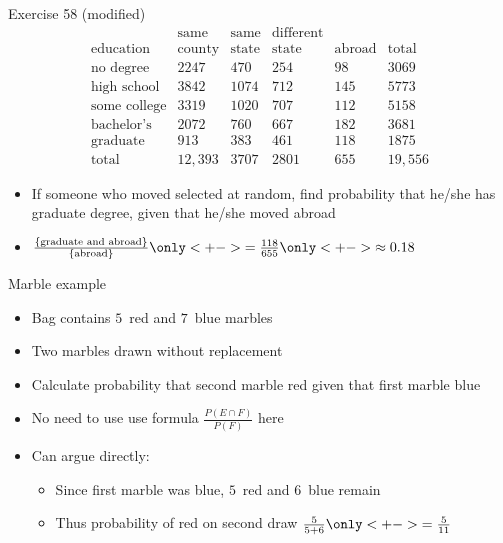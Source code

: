 \documentclass{beamer}
\theoremstyle{definition}
\begin{document}
\begin{frame}{Exercise 58 (modified)}
\[\begin{array}{r|llll|l}
&\text{same}&\text{same}&\text{different}&&\\
\text{education}&\text{county}
&\text{state}&\text{state}&\text{abroad}&\text{total}\\\hline
\text{no degree}&2247&470&254&98&3069\\
\text{high school}&3842&1074&712&145&5773\\
\text{some college}&3319&1020&707&112&5158\\
\text{bachelor's}&2072&760&667&182&3681\\
\text{graduate}&913&383&461&118&1875\\\hline
\text{total}&12,393&3707&2801&655&19,556
\end{array}\]
\begin{itemize}
\item If someone who moved selected at random, find probability
that he/she has graduate degree, given that he/she moved abroad
\item $\frac{\left\{\text{graduate and abroad}\right\}}
{\left\{\text{abroad}\right\}}
\only<+->{=\frac{118}{655}}\only<+->{\approx 0.18}$
\end{itemize}
\end{frame}

\begin{frame}{Marble example}
\begin{itemize}
\item Bag contains $5$~red and $7$~blue marbles
\item Two marbles drawn without replacement
\item Calculate probability that second marble red
given that first marble blue
\item No need to use use formula
$\frac{P\left(E\cap F\right)}{P\left(F\right)}$ here
\item Can argue directly:
\begin{itemize}
\item Since first marble was blue, $5$~red and \alert{$6$~blue} remain
\item Thus probability of red on second draw $\frac{5}{5+6}
\only<+->{=\frac{5}{11}}$
\end{itemize}
\end{itemize}
\end{frame}
\end{document}
